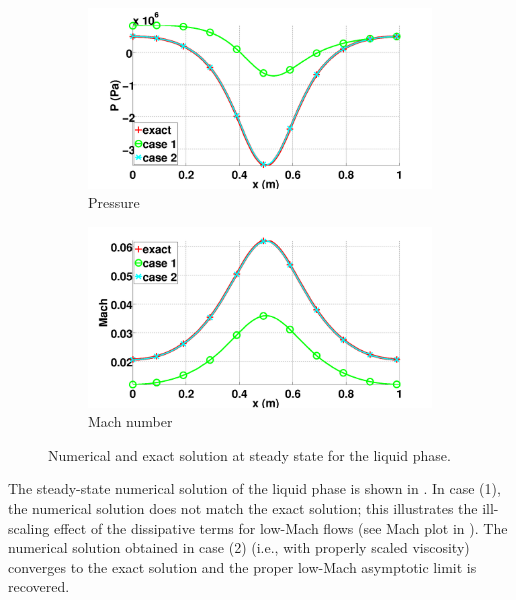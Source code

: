 \documentclass[preprint,10pt]{elsarticle}
\begin{document}
\begin{figure}[H]
        \begin{subfigure}[b]{0.495\textwidth}
                \centering
                \includegraphics[width=\textwidth]{figures/liquid_pressure_llf_and_exact_100.png}
                \caption{Pressure}
                \label{fig:liq-phase-press}
        \end{subfigure}        
        \begin{subfigure}[b]{0.495\textwidth}
                \centering
                \includegraphics[width=\textwidth]{figures/liquid_mach_llf_and_exact_100.png}
                \caption{Mach number}
                \label{fig:liq-phase-mach}
        \end{subfigure}
        \caption{Numerical and exact solution at steady state for the liquid phase.}\label{fig:liq-phase}
\end{figure}
%
The steady-state numerical solution of the liquid phase is shown in .
In case (1), the numerical solution does not match the exact solution; this illustrates the ill-scaling effect of the 
dissipative terms for low-Mach flows (see Mach plot in  ). The numerical solution obtained in case (2)
(i.e., with properly scaled viscosity) converges to the exact solution and the proper low-Mach asymptotic limit is recovered. 
\end{document}
